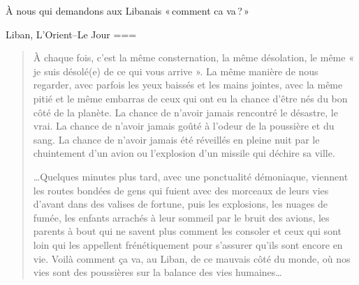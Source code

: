 À nous qui demandons aux Libanais « comment ca va ? »

Liban, L’Orient–Le Jour
===
\begin{quote}
    À chaque fois, c’est la même consternation, la même désolation, le même « je suis désolé(e) de ce qui vous arrive ». La même manière de nous regarder, avec parfois les yeux baissés et les mains jointes, avec la même pitié et le même embarras de ceux qui ont eu la chance d’être nés du bon côté de la planète. La chance de n’avoir jamais rencontré le désastre, le vrai. La chance de n’avoir jamais goûté à l’odeur de la poussière et du sang. La chance de n’avoir jamais été réveillés en pleine nuit par le chuintement d’un avion ou l’explosion d’un missile qui déchire sa ville.

    …Quelques minutes plus tard, avec une ponctualité démoniaque, viennent les routes bondées de gens qui fuient avec des morceaux de leurs vies d’avant dans des valises de fortune, puis les explosions, les nuages de fumée, les enfants arrachés à leur sommeil par le bruit des avions, les parents à bout qui ne savent plus comment les consoler et ceux qui sont loin qui les appellent frénétiquement pour s’assurer qu’ils sont encore en vie. Voilà comment ça va, au Liban, de ce mauvais côté du monde, où nos vies sont des poussières sur la balance des vies humaines…
\end{quote}
\nocite{khoury2024}